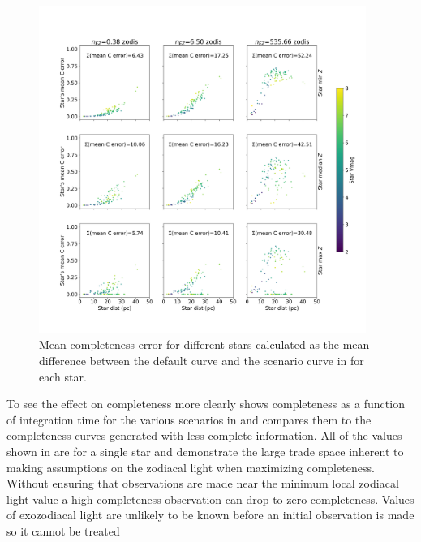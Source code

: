 \begin{figure}
  \begin{center}
    \includegraphics[width=0.95\textwidth]{ch3/figures/mean_comp_errors.png}
  \end{center}
  \caption{Mean completeness error for different stars calculated as the mean difference between
  the default curve and the scenario curve in  for each star.}
  \label{fig:mean_comp_errors}
\end{figure}

To see the effect on completeness more clearly  shows
completeness as a function of integration time for the various scenarios in
 and compares them to the completeness curves generated
with less complete information. All of the values shown in
 are for a
single star and demonstrate the large trade space inherent to making
assumptions on the zodiacal light when maximizing completeness. Without
ensuring that observations are made near the minimum local zodiacal light value
a high completeness observation can drop to zero completeness. Values of 
exozodiacal light are unlikely to be known before an initial observation is made
so it cannot be treated 

